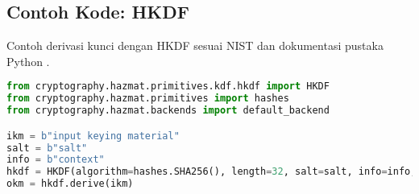 \documentclass[../main.tex]{subfiles}
\begin{document}
\subsection{Contoh Kode: HKDF}
Contoh derivasi kunci dengan HKDF sesuai NIST dan dokumentasi pustaka Python \parencite{rfc5869,cryptography-hkdf-docs}.

\begin{lstlisting}[language=Python, caption={HKDF}, label={lst:hkdf}]
from cryptography.hazmat.primitives.kdf.hkdf import HKDF
from cryptography.hazmat.primitives import hashes
from cryptography.hazmat.backends import default_backend

ikm = b"input keying material"
salt = b"salt"
info = b"context"
hkdf = HKDF(algorithm=hashes.SHA256(), length=32, salt=salt, info=info, backend=default_backend())
okm = hkdf.derive(ikm)
\end{lstlisting}
\end{document}
